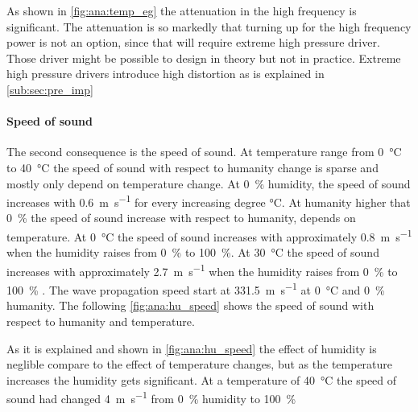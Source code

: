 

As shown in \autoref{fig:ana:temp_eg} the attenuation in the high frequency is significant. The attenuation is so markedly that turning up for the high frequency power is not an option, since that will require extreme high pressure driver. Those driver might be possible to design in theory but not in practice. Extreme high pressure drivers introduce high distortion as is explained in \autoref{sub:sec:pre_imp}
 
\paragraph{Speed of sound} The second consequence is the speed of sound. At temperature range from \SI{0}{\celsius} to \SI{40}{\celsius} the speed of sound with respect to humanity change is sparse and mostly only depend on temperature change. At \SI{0}{\percent} humidity, the speed of sound increases with \SI{0.6}{\meter\per\second} for every increasing degree \si{\celsius}. At humanity higher that \SI{0}{\percent} the speed of sound increase with respect to humanity, depends on temperature. At \SI{0}{\celsius} the speed of sound increases with approximately \SI{0.8}{\meter\per\second} when the humidity raises from \SI{0}{\percent} to \SI{100}{\percent}. At \SI{30}{\celsius} the speed of sound increases with approximately \SI{2.7}{\meter\per\second} when the humidity raises from \SI{0}{\percent} to \SI{100}{\percent} \citep{humanity_effect_on_speed} \citep{bohn1987environmental}.  The wave propagation speed start at \SI{331.5}{\meter\per\second} at \SI{0}{\celsius} and \SI{0}{\percent} humanity. The following \autoref{fig:ana:hu_speed} shows the speed of sound with respect to humanity and temperature. 


As it is explained and shown in \autoref{fig:ana:hu_speed} the effect of humidity is neglible compare to the effect of temperature changes, but as the temperature increases the humidity gets significant. At a temperature of \SI{40}{\celsius} the speed of sound had changed \SI{4}{\meter\per\second} from \SI{0}{\percent} humidity to \SI{100}{\percent}


